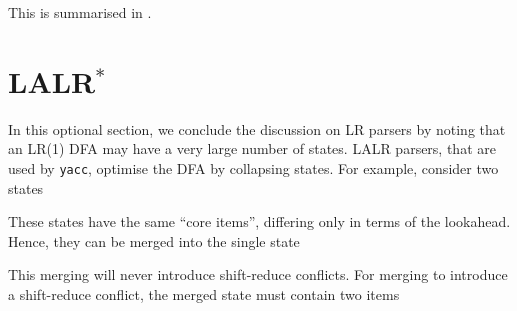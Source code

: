 This is summarised in .

\section{LALR$^*$}
In this optional section, we conclude the discussion on LR parsers by noting that an LR(1) DFA may have a very large number of states. LALR parsers, that are used by \texttt{yacc}, optimise the DFA by collapsing states. For example, consider two states

\begin{center}
\end{center}

These states have the same ``core items'', differing only in terms of the lookahead. Hence, they can be merged into the single state

\begin{center}
\end{center}

This merging will never introduce shift-reduce conflicts. For merging to introduce a shift-reduce conflict, the merged state must contain two items

